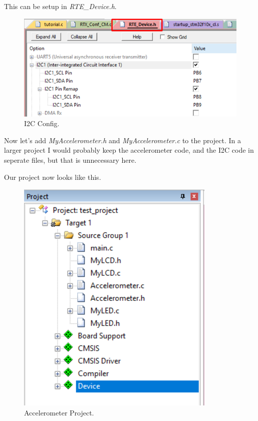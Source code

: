\documentclass{article}
\begin{document}
This can be setup in \textit{RTE\_Device.h}.
\begin{figure}[H]
    \centering
    \includegraphics[width=0.8\linewidth]{pics/I2CConfig.png}
    \caption{I2C Config.}
    \label{fig:I2CConfig}
\end{figure}

Now let's add \textit{MyAccelerometer.h} and \textit{MyAccelerometer.c} to the project.
In a larger project I would probably keep the accelerometer code, and the I2C code in seperate files,
but that is unnecessary here.

\newpage

Our project now looks like this.
\begin{figure}[H]
    \centering
    \includegraphics[width=0.35\linewidth]{pics/AccProject.png}
    \caption{Accelerometer Project.}
    \label{fig:AccProject}
\end{figure}
\end{document}
